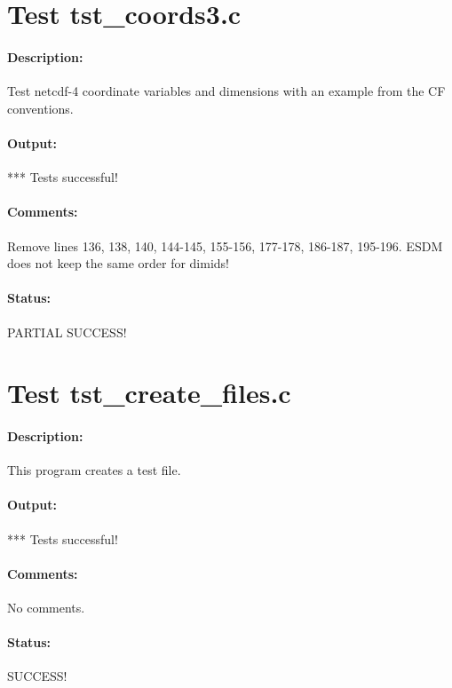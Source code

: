 \section{Test tst\_coords3.c}

\paragraph{Description:} Test netcdf-4 coordinate variables and dimensions with an example from the CF conventions.

\paragraph{Output:} *** Tests successful!

\paragraph{Comments:} Remove lines 136, 138, 140, 144-145, 155-156, 177-178, 186-187, 195-196. ESDM does not keep the same order for dimids!

\paragraph{Status:} PARTIAL SUCCESS!

\section{Test tst\_create\_files.c}

\paragraph{Description:} This program creates a test file.

\paragraph{Output:} *** Tests successful!

\paragraph{Comments:} No comments.

\paragraph{Status:} SUCCESS!

\section{}

